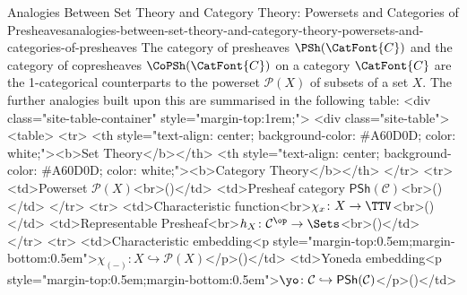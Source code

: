 \begin{remark}{Analogies Between Set Theory and Category Theory: Powersets and Categories of Presheaves}{analogies-between-set-theory-and-category-theory-powersets-and-categories-of-presheaves}%
    The category of presheaves $\PSh(\CatFont{C})$ and the category of copresheaves $\CoPSh(\CatFont{C})$ on a category $\CatFont{C}$ are the 1-categorical counterparts to the powerset $\mathcal{P}(X)$ of subsets of a set $X$. The further analogies built upon this are summarised in the following table:
    <div class="site-table-container" style="margin-top:1rem;">
      <div class="site-table">
        <table>
          <tr>
            <th style="text-align: center; background-color: #A60D0D; color: white;"><b>Set Theory</b></th>
            <th style="text-align: center; background-color: #A60D0D; color: white;"><b>Category Theory</b></th>
          </tr>
          <tr>
            <td>Powerset $\mathcal{P}(X)$<br>()</td>
            <td>Presheaf category $\mathsf{PSh}(\mathcal{C})$<br>()</td>
          </tr>
          <tr>
            <td>Characteristic function<br>$\chi_{x}\colon X\to\TTV$<br>()</td>
            <td>Representable Presheaf<br>$h_{X}\colon\mathcal{C}^{\op}\to\Sets$<br>()</td>
          </tr>
          <tr>
            <td>Characteristic embedding<p style="margin-top:0.5em;margin-bottom:0.5em">$\chi_{(-)}\colon X\hookrightarrow\mathcal{P}(X)$</p>()</td>
            <td>Yoneda embedding<p style="margin-top:0.5em;margin-bottom:0.5em">$\yo\colon\mathcal{C}\hookrightarrow\mathsf{PSh}(\mathcal{C})$</p>()</td>

\end{remark}
